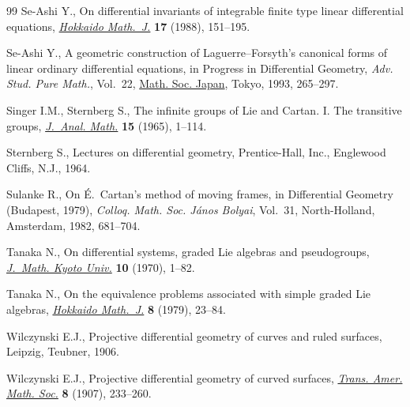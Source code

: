 \documentclass[10pt,a4paper]{amsart}
\numberwithin{equation}{section}
\begin{document}
\begin{thebibliography}{99}
Se-Ashi Y., On differential invariants of integrable finite type linear
 differential equations, \href{https://doi.org/10.14492/hokmj/1381517803}{\textit{Hokkaido Math.~J.}} \textbf{17} (1988),
 151--195.

Se-Ashi Y., A geometric construction of {L}aguerre--{F}orsyth's canonical forms
 of linear ordinary differential equations, in Progress in Differential
 Geometry, \textit{Adv. Stud. Pure Math.}, Vol.~22, \href{https://doi.org/10.2969/aspm/02210265}{Math. Soc. Japan}, Tokyo,
 1993, 265--297.

Singer I.M., Sternberg S., The infinite groups of {L}ie and {C}artan. {I}.
 {T}he transitive groups, \href{https://doi.org/10.1007/BF02787690}{\textit{J.~Anal. Math.}} \textbf{15} (1965), 1--114.

Sternberg S., Lectures on differential geometry, Prentice-Hall, Inc., Englewood
 Cliffs, N.J., 1964.

Sulanke R., On \'E.~{C}artan's method of moving frames, in Differential
 Geometry ({B}udapest, 1979), \textit{Colloq. Math. Soc. J\'anos Bolyai},
 Vol.~31, North-Holland, Amsterdam, 1982, 681--704.

Tanaka N., On differential systems, graded {L}ie algebras and pseudogroups,
 \href{https://doi.org/10.1215/kjm/1250523814}{\textit{J.~Math. Kyoto Univ.}} \textbf{10} (1970), 1--82.

Tanaka N., On the equivalence problems associated with simple graded {L}ie
 algebras, \href{https://doi.org/10.14492/hokmj/1381758416}{\textit{Hokkaido Math.~J.}} \textbf{8} (1979), 23--84.

Wilczynski E.J., Projective differential geometry of curves and ruled surfaces,
 Leipzig, Teubner, 1906.

Wilczynski E.J., Projective differential geometry of curved surfaces,
 \href{https://doi.org/10.2307/1986347}{\textit{Trans. Amer. Math. Soc.}} \textbf{8} (1907), 233--260.

\end{thebibliography}
\end{document}
